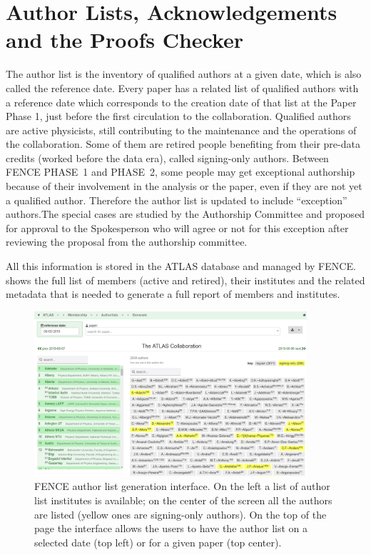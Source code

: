 
\section{Author Lists, Acknowledgements and the Proofs Checker}%
\label{sec:Authorlists_Acknowledgements_and_ProofChecker}

The author list is the inventory of qualified authors at a given date, which is also called the reference date. Every paper has a related list of qualified authors with a reference date which corresponds to the creation date of that list at the Paper Phase 1, just before the first circulation to the collaboration. Qualified authors are active physicists, still contributing to the maintenance and the operations of the collaboration.
Some of them are retired people benefiting from their pre-data credits (worked before the data era), called signing-only authors.
Between FENCE PHASE~1 and PHASE~2, some people may get exceptional authorship because of their involvement in the analysis or the paper,
even if they are not yet a qualified author.
Therefore the author list is updated to include \enquote{exception} authors.The special cases are studied by the Authorship Committee and proposed for approval to the Spokesperson who will agree or not for this exception after reviewing the proposal from the authorship committee.

All this information is stored in the ATLAS database and managed by FENCE\@.
 shows the full list of members (active and retired), their institutes and the related metadata that is needed to generate a full report of members and institutes.

\begin{figure}[htb]
  \centering
  \includegraphics[width=0.9\textwidth]{figures/authorlist_generation.png}
  \caption{FENCE author list generation interface. On the left a list of author list institutes is available; on the center of the screen all the authors are listed (yellow ones are signing-only  authors). On the top of the page the interface allows the users to have the author list on a selected date (top left) or for a given paper (top center).}%
  \label{fig:authorlist_generation}
\end{figure}

